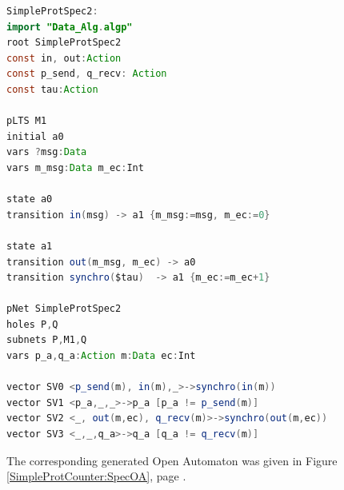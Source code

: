 \documentclass{lmcs}
\begin{document}
\begin{lstlisting}[basicstyle=\scriptsize\ttfamily, language=java, frame=single]
SimpleProtSpec2:
import "Data_Alg.algp"
root SimpleProtSpec2
const in, out:Action
const p_send, q_recv: Action
const tau:Action

pLTS M1
initial a0 
vars ?msg:Data
vars m_msg:Data m_ec:Int

state a0
transition in(msg) -> a1 {m_msg:=msg, m_ec:=0}

state a1
transition out(m_msg, m_ec) -> a0
transition synchro($tau)  -> a1 {m_ec:=m_ec+1}

pNet SimpleProtSpec2
holes P,Q
subnets P,M1,Q
vars p_a,q_a:Action m:Data ec:Int

vector SV0 <p_send(m), in(m),_>->synchro(in(m))
vector SV1 <p_a,_,_>->p_a [p_a != p_send(m)]
vector SV2 <_, out(m,ec), q_recv(m)>->synchro(out(m,ec))
vector SV3 <_,_,q_a>->q_a [q_a != q_recv(m)]

  \end{lstlisting}




\bigskip
The corresponding generated Open Automaton was given in Figure \ref{SimpleProtCounter:SpecOA},
page \pageref{SimpleProtCounter:SpecOA}.\\
\end{document}
